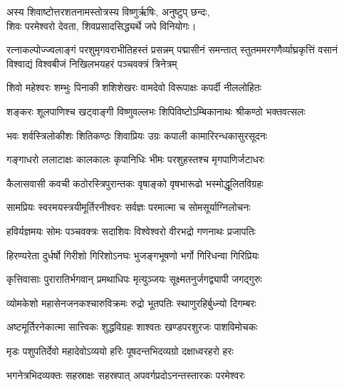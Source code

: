 

अस्य शिवाष्टोत्तरशतनामस्तोत्रस्य विष्णुर्ऋषिः, अनुष्टुप् छन्दः,\\
शिवः परमेश्वरो देवता, शिवप्रसादसिद्ध्यर्थे जपे विनियोगः।

{रत्नाकल्पोज्ज्वलाङ्गं परशुमृगवराभीतिहस्तं प्रसन्नम्}
{पद्मासीनं समन्तात् स्तुतममरगणैर्व्याघ्रकृत्तिं वसानं}
{विश्वाद्यं विश्वबीजं निखिलभयहरं पञ्चवक्त्रं त्रिनेत्रम्}


\twolineshloka
{शिवो महेश्वरः शम्भुः पिनाकी शशिशेखरः}
{वामदेवो विरूपाक्षः कपर्दी नीललोहितः}

\twolineshloka
{शङ्करः शूलपाणिश्च खट्वाङ्गी विष्णुवल्लभः}
{शिपिविष्टोऽम्बिकानाथः श्रीकण्ठो भक्तवत्सलः}

\twolineshloka
{भवः शर्वस्त्रिलोकीशः शितिकण्ठः शिवाप्रियः}
{उग्रः कपाली कामारिरन्धकासुरसूदनः}

\twolineshloka
{गङ्गाधरो ललाटाक्षः कालकालः कृपानिधिः}
{भीमः परशुहस्तश्च मृगपाणिर्जटाधरः}

\twolineshloka
{कैलासवासी कवची कठोरस्त्रिपुरान्तकः}
{वृषाङ्को वृषभारूढो भस्मोद्धूलितविग्रहः}

\twolineshloka
{सामप्रियः स्वरमयस्त्रयीमूर्तिरनीश्वरः}
{सर्वज्ञः परमात्मा च सोमसूर्याग्निलोचनः}

\twolineshloka
{हविर्यज्ञमयः सोमः पञ्चवक्त्रः सदाशिवः}
{विश्वेश्वरो वीरभद्रो गणनाथः प्रजापतिः}

\twolineshloka
{हिरण्यरेता दुर्धर्षो गिरीशो गिरिशोऽनघः}
{भुजङ्गभूषणो भर्गो गिरिधन्वा गिरिप्रियः}

\twolineshloka
{कृत्तिवासाः पुरारातिर्भगवान् प्रमथाधिपः}
{मृत्युञ्जयः सूक्ष्मतनुर्जगद्व्यापी जगद्गुरुः}

\twolineshloka
{व्योमकेशो महासेनजनकश्चारुविक्रमः}
{रुद्रो भूतपतिः स्थाणुरहिर्बुध्न्यो दिगम्बरः}

\twolineshloka
{अष्टमूर्तिरनेकात्मा सात्त्विकः शुद्धविग्रहः}
{शाश्वतः खण्डपरशुरजः पाशविमोचकः}

\twolineshloka
{मृडः पशुपतिर्देवो महादेवोऽव्ययो हरिः}
{पूषदन्तभिदव्यग्रो दक्षाध्वरहरो हरः}

\twolineshloka
{भगनेत्रभिदव्यक्तः सहस्राक्षः सहस्रपात्}
{अपवर्गप्रदोऽनन्तस्तारकः परमेश्वरः}

